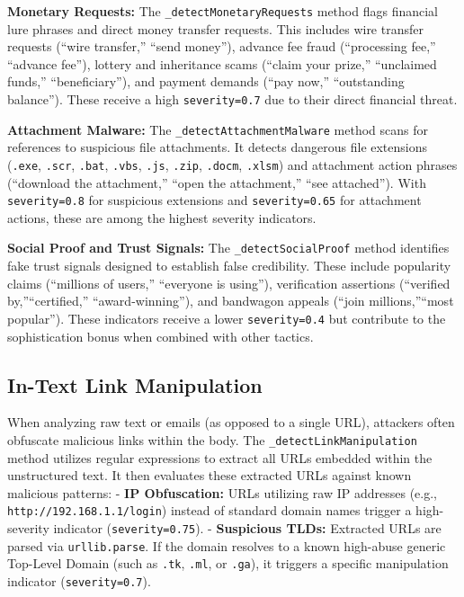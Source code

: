 \textbf{Monetary Requests:} The \texttt{\_detectMonetaryRequests} method
flags financial lure phrases and direct money transfer requests. This
includes wire transfer requests (``wire transfer,'' ``send money''), advance
fee fraud (``processing fee,'' ``advance fee''), lottery and inheritance
scams (``claim your prize,'' ``unclaimed funds,'' ``beneficiary''), and
payment demands (``pay now,'' ``outstanding balance''). These receive a
high \texttt{severity=0.7} due to their direct financial threat.

\textbf{Attachment Malware:} The \texttt{\_detectAttachmentMalware} method
scans for references to suspicious file attachments. It detects dangerous
file extensions (\texttt{.exe}, \texttt{.scr}, \texttt{.bat}, \texttt{.vbs},
\texttt{.js}, \texttt{.zip}, \texttt{.docm}, \texttt{.xlsm}) and attachment
action phrases (``download the attachment,'' ``open the attachment,'' ``see
attached''). With \texttt{severity=0.8} for suspicious extensions and
\texttt{severity=0.65} for attachment actions, these are among the highest
severity indicators.

\textbf{Social Proof and Trust Signals:} The
\texttt{\_detectSocialProof} method identifies fake trust signals designed
to establish false credibility. These include popularity claims (``millions
of users,'' ``everyone is using''), verification assertions (``verified by,''``certified,'' ``award-winning''), and bandwagon appeals (``join millions,''``most popular''). These indicators receive a lower \texttt{severity=0.4}
but contribute to the sophistication bonus when combined with other
tactics.

\subsection{In-Text Link
Manipulation}\label{in-text-link-manipulation}

When analyzing raw text or emails (as opposed to a single URL),
attackers often obfuscate malicious links within the body. The
\texttt{\_detectLinkManipulation} method utilizes regular expressions to
extract all URLs embedded within the unstructured text. It then
evaluates these extracted URLs against known malicious patterns: -
\textbf{IP Obfuscation:} URLs utilizing raw IP addresses (e.g.,
\texttt{http://192.168.1.1/login}) instead of standard domain names
trigger a high-severity indicator (\texttt{severity=0.75}). -
\textbf{Suspicious TLDs:} Extracted URLs are parsed via
\texttt{urllib.parse}. If the domain resolves to a known high-abuse
generic Top-Level Domain (such as \texttt{.tk}, \texttt{.ml}, or
\texttt{.ga}), it triggers a specific manipulation indicator
(\texttt{severity=0.7}).

